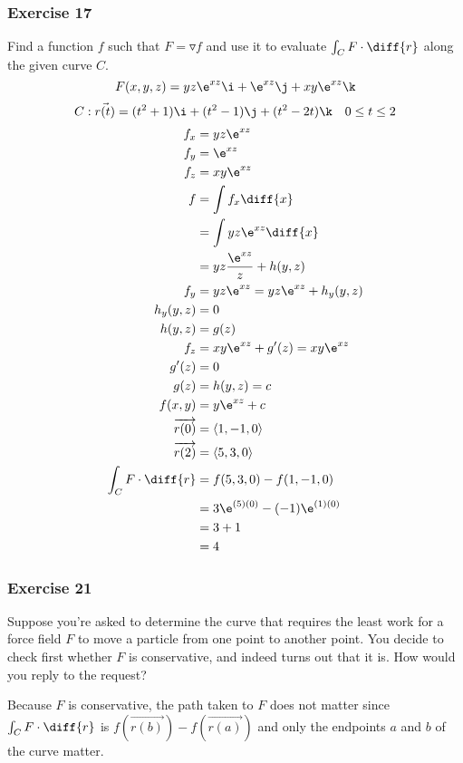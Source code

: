 \documentclass{math}
\begin{document}
\subsubsection*{Exercise 17}
Find a function \( f \) such that \( F = \triangledown f \) and use it to
evaluate \( \int_{C}F\cdot\diff{r} \) along the given curve \( C \).
\[ F(x,y,z) = yz\e^{xz}\i+\e^{xz}\j+xy\e^{xz}\k \]
\[ C: \vec{r(t)} = (t^2+1)\i+(t^2-1)\j+(t^2-2t)\k \quad 0\le t\le2 \]
\begin{align*}
  f_x &= yz\e^{xz} \\
  f_y &= \e^{xz} \\
  f_z &= xy\e^{xz} \\
  f &= \int f_x\diff{x} \\
  &= \int yz\e^{xz}\diff{x} \\
  &= yz\frac{\e^{xz}}{z}+h(y,z) \\
  f_y &= yz\e^{xz} = yz\e^{xz}+h_y(y,z) \\
  h_y(y,z) &= 0 \\
  h(y,z) &= g(z) \\
  f_z &= xy\e^{xz}+g'(z) = xy\e^{xz} \\
  g'(z) &= 0 \\
  g(z) &= h(y,z) = c \\
  f(x,y) &= y\e^{xz}+c \\
  \overrightarrow{r(0)} &= \langle1,-1,0\rangle \\
  \overrightarrow{r(2)} &= \langle5,3,0\rangle \\
  \int_{C}F\cdot\diff{r} &= f(5,3,0)-f(1,-1,0) \\
  &= 3\e^{(5)(0)}-(-1)\e^{(1)(0)} \\
  &= 3+1 \\
  &= 4
\end{align*}

\subsubsection*{Exercise 21}
Suppose you're asked to determine the curve that requires the least work for a
force field \( F \) to move a particle from one point to another point. You
decide to check first whether \( F \) is conservative, and indeed turns out that
it is. How would you reply to the request? \par
Because \( F \) is conservative, the path taken to \( F \) does not matter since
\( \int_{C}F\cdot\diff{r} \) is \( f(\overrightarrow{r(b)})-
f(\overrightarrow{r(a)}) \) and only the endpoints \( a \) and \( b \) of the
curve matter.
\end{document}
